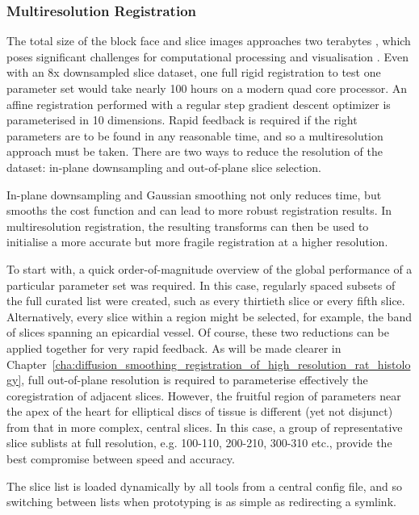     \subsubsection{Multiresolution Registration} %
    \label{ssub:multiresolution_registration}
			The total size of the block face and slice images approaches two terabytes \cite{Gibb2012}, which poses significant challenges for computational processing and visualisation \cite{Goodyer2009}. Even with an 8x downsampled slice dataset, one full rigid registration to test one parameter set would take nearly 100 hours on a modern quad core processor. An affine registration performed with a regular step gradient descent optimizer is parameterised in 10 dimensions. Rapid feedback is required if the right parameters are to be found in any reasonable time, and so a multiresolution approach must be taken. There are two ways to reduce the resolution of the dataset: in-plane downsampling and out-of-plane slice selection.
			
      In-plane downsampling and Gaussian smoothing not only reduces time, but smooths the cost function and can lead to more robust registration results. In multiresolution registration, the resulting transforms can then be used to initialise a more accurate but more fragile registration at a higher resolution.
			
      To start with, a quick order-of-magnitude overview of the global performance of a particular parameter set was required. In this case, regularly spaced subsets of the full curated list were created, such as every thirtieth slice or every fifth slice. Alternatively, every slice within a region might be selected, for example, the band of slices spanning an epicardial vessel. Of course, these two reductions can be applied together for very rapid feedback. As will be made clearer in Chapter~\ref{cha:diffusion_smoothing_registration_of_high_resolution_rat_histology}, full out-of-plane resolution is required to parameterise effectively the coregistration of adjacent slices. However, the fruitful region of parameters near the apex of the heart for elliptical discs of tissue is different (yet not disjunct) from that in more complex, central slices. In this case, a group of representative slice sublists at full resolution, e.g. 100-110, 200-210, 300-310 etc., provide the best compromise between speed and accuracy.
			
			The slice list is loaded dynamically by all tools from a central config file, and so switching between lists when prototyping is as simple as redirecting a symlink.
    
